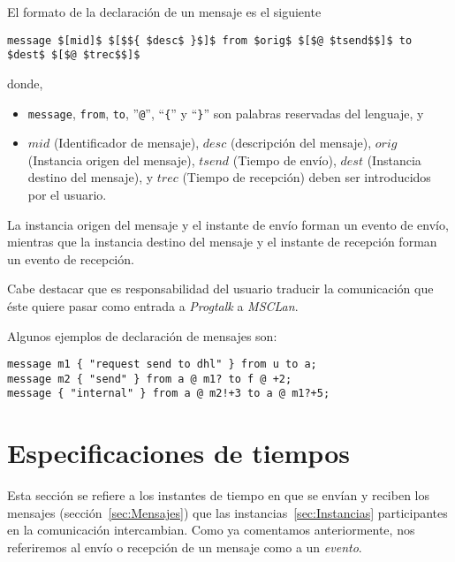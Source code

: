 El formato de la declaración de un mensaje es el siguiente
\begin{center}
  \begin{minipage}{0.75\linewidth}
\begin{lstlisting}[mathescape]
message $[mid]$ $[$${ $desc$ }$]$ from $orig$ $[$@ $tsend$$]$ to $dest$ $[$@ $trec$$]$
\end{lstlisting}
  \end{minipage}
\end{center}
donde,
\begin{itemize}
\item \lstinline{message}, \lstinline{from}, \lstinline{to},
  ''\lstinline{@}'', ``\lstinline!{!'' y ``\lstinline!}!'' son
  palabras reservadas del lenguaje, y
\item $mid$ (Identificador de mensaje), $desc$ (descripción del mensaje), $orig$
  (Instancia origen del mensaje), $tsend$ (Tiempo de envío), $dest$
  (Instancia destino del mensaje), y $trec$ (Tiempo de recepción)
  deben ser introducidos por el usuario.
\end{itemize}

La instancia origen del mensaje y el instante de envío forman un
evento de envío, mientras que la instancia destino del mensaje y el
instante de recepción forman un evento de recepción.

Cabe destacar que es responsabilidad del usuario traducir la
comunicación que éste quiere pasar como entrada a \textit{Progtalk} a
\textit{MSCLan}.

Algunos ejemplos de declaración de mensajes son:

\begin{lstlisting}
message m1 { "request send to dhl" } from u to a;
message m2 { "send" } from a @ m1? to f @ +2;
message { "internal" } from a @ m2!+3 to a @ m1?+5;
\end{lstlisting}

\section{Especificaciones de tiempos}
\label{sec:Tiempos}

Esta sección se refiere a los instantes de tiempo en que se envían y
reciben los mensajes (sección~\ref{sec:Mensajes}) que las
instancias~\ref{sec:Instancias} participantes en la
comunicación intercambian. Como ya comentamos anteriormente, nos
referiremos al envío o recepción de un mensaje como a un
\textit{evento}.

